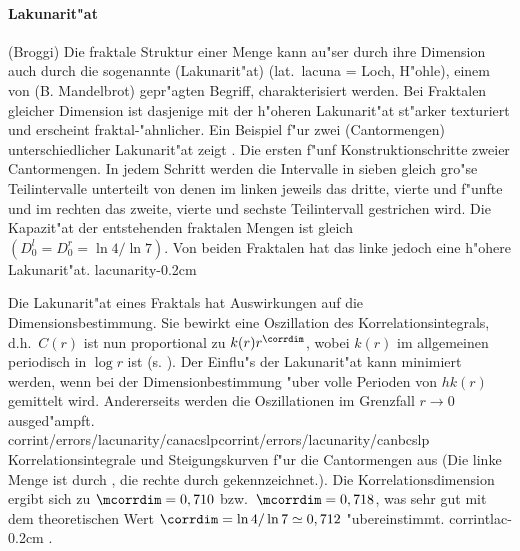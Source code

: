 \paragraph{Lakunarit"at}
\korrektur(Broggi)
Die fraktale Struktur einer Menge kann au"ser durch ihre Dimension auch durch die
sogenannte \begriff(Lakunarit"at) (lat.\  lacuna = Loch, H"ohle), einem von
\autor(B. Mandelbrot) \cite{Mandelbrot82} gepr"agten Begriff, charakterisiert werden. 
Bei Fraktalen gleicher Dimension ist dasjenige mit der h"oheren Lakunarit"at st"arker
texturiert und erscheint fraktal-"ahnlicher. Ein Beispiel f"ur zwei \begriff(Cantormengen)
unterschiedlicher Lakunarit"at zeigt .
%
{Die ersten f"unf Konstruktionschritte zweier Cantormengen. In jedem Schritt werden die
Intervalle in sieben gleich gro"se Teilintervalle unterteilt von denen im linken jeweils
das dritte, vierte und f"unfte und im rechten das zweite, vierte und sechste Teilintervall
gestrichen wird. Die Kapazit"at der entstehenden fraktalen Mengen ist 
gleich $(D^l_0=D^r_0=\ln4/\ln 7)$. Von beiden Fraktalen hat das linke jedoch eine h"ohere Lakunarit"at.
}{lacunarity}{-0.2cm}

Die Lakunarit"at eines Fraktals hat Auswirkungen auf die Dimensionsbestimmung. Sie bewirkt 
eine Oszillation des Korrelationsintegrals, d.h.\  $C(r)$ ist nun proportional zu
$k(r)r^\corrdim$, wobei $k(r)$ im allgemeinen periodisch in $\log r$ ist
(s. ). Der Einflu"s der  Lakunarit"at kann minimiert werden, wenn bei
der Dimensionbestimmung "uber volle Perioden von $hk(r)$ gemittelt wird.
Andererseits werden die Oszillationen im Grenzfall $r\to 0$
ausged"ampft\cite{Grassberger88}.
%
{corrint/errors/lacunarity/canacslp}{corrint/errors/lacunarity/canbcslp}
{Korrelationsintegrale und Steigungskurven f"ur die Cantormengen aus 
(Die linke Menge ist durch \gpmarkb, die rechte durch \gpmarkd{} gekennzeichnet.). Die
Korrelationsdimension ergibt sich zu $\mcorrdim=0,710$ bzw.\  $\mcorrdim=0,718$, was sehr gut mit dem
theoretischen Wert $\corrdim=\ln 4 /\ln 7\simeq 0,712$ "ubereinstimmt\footnotemark.
}{corrintlac}{-0.2cm}
.



